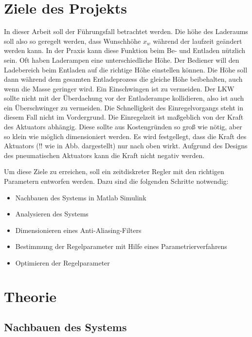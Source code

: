 	\section{Ziele des Projekts}
	In dieser Arbeit soll der Führungsfall betrachtet werden. Die höhe des Laderaums soll also so geregelt werden, dass Wunschhöhe $x_{w}$ während der laufzeit geändert werden kann.
	In der Praxis kann diese Funktion beim Be- und Entladen nützlich sein. Oft haben Laderampen eine unterschiedliche Höhe. Der Bediener will den Ladebereich
	beim Entladen auf die richtige Höhe einstellen können. Die Höhe soll dann während dem gesamten Entladeprozess die gleiche Höhe beibehalten, auch wenn die Masse geringer wird.
	Ein Einschwingen ist zu vermeiden. Der LKW sollte nicht mit der Überdachung vor der Entladerampe kollidieren, also ist auch ein Überschwinger zu vermeiden.
	Die Schnelligkeit des Einregelvorgangs steht in diesem Fall nicht im Vordergrund. Die Einregelzeit ist maßgeblich von der Kraft des Aktuators abhängig.
	Diese sollte aus Kostengründen so groß wie nötig, aber so klein wie möglich dimensioniert werden. 
	Es wird festgellegt, dass die Kraft des Aktuators (!! wie in Abb. dargestellt) nur nach oben wirkt. Aufgrund des Designs des pneumatischen Aktuators kann 
	die Kraft nicht negativ werden.

	Um diese Ziele zu erreichen, soll ein zeitdiskreter Regler mit den
	richtigen Parametern entworfen werden. Dazu sind die
	folgenden Schritte notwendig:



	\begin{itemize}
		\item Nachbauen des Systems in Matlab Simulink
		\item Analysieren des Systems
		\item Dimensionieren eines Anti-Aliasing-Filters
		\item Bestimmung der Regelparameter mit Hilfe eines Parametrierverfahrens
		\item Optimieren der Regelparameter
	\end{itemize}
		
	\section{Theorie}

	\subsection{Nachbauen des Systems}

